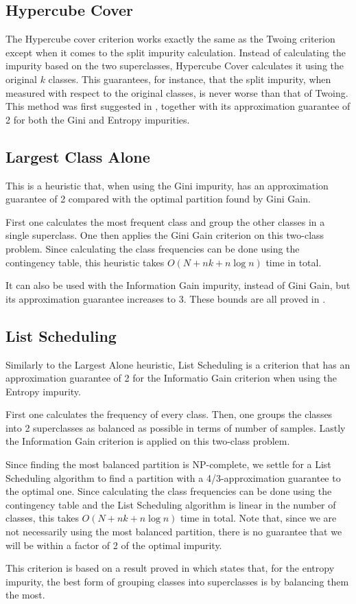\subsection{Hypercube Cover}

The Hypercube cover criterion works exactly the same as the Twoing criterion except when it comes to the split impurity calculation. Instead of calculating the impurity based on the two superclasses, Hypercube Cover calculates it using the original $k$ classes. This guarantees, for instance, that the split impurity, when measured with respect to the original classes, is never worse than that of Twoing. This method was first suggested in \cite{icml2018}, together with its approximation guarantee of 2 for both the Gini and Entropy impurities.


\subsection{Largest Class Alone}

This is a heuristic that, when using the Gini impurity, has an approximation guarantee of 2 compared with the optimal partition found by Gini Gain.

First one calculates the most frequent class and group the other classes in a single superclass. One then applies the Gini Gain criterion on this two-class problem. Since calculating the class frequencies can be done using the contingency table, this heuristic takes $O(N + n k + n \log n)$ time in total.

It can also be used with the Information Gain impurity, instead of Gini Gain, but its approximation guarantee increases to 3. These bounds are all proved in \cite{icml2018}.

\subsection{List Scheduling}

Similarly to the Largest Alone heuristic, List Scheduling is a criterion that has an approximation guarantee of 2 for the Informatio Gain criterion when using the Entropy impurity.

First one calculates the frequency of every class. Then, one groups the classes into 2 superclasses as balanced as possible in terms of number of samples. Lastly the Information Gain criterion is applied on this two-class problem.

Since finding the most balanced partition is NP-complete, we settle for a List Scheduling algorithm to find a partition with a 4/3-approximation guarantee to the optimal one. Since calculating the class frequencies can be done using the contingency table and the List Scheduling algorithm is linear in the number of classes, this takes $O(N + n k + n \log n)$ time in total. Note that, since we are not necessarily using the most balanced partition, there is no guarantee that we will be within a factor of 2 of the optimal impurity.

This criterion is based on a result proved in \cite{icml2018} which states that, for the entropy impurity, the best form of grouping classes into superclasses is by balancing them the most.